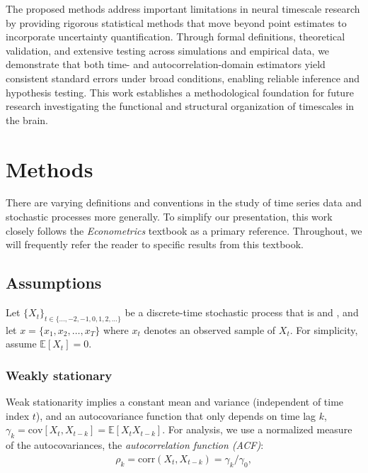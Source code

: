 \documentclass[9pt]{article}
\begin{document}
The proposed methods address important limitations in neural timescale research by providing rigorous statistical methods that move beyond point estimates to incorporate uncertainty quantification. Through formal definitions, theoretical validation, and extensive testing across simulations and empirical data, we demonstrate that both time- and autocorrelation-domain estimators yield consistent standard errors under broad conditions, enabling reliable inference and hypothesis testing. This work establishes a methodological foundation for future research investigating the functional and structural organization of timescales in the brain.

\section{Methods}

There are varying definitions and conventions in the study of time series data and stochastic processes more generally. To simplify our presentation, this work closely follows the \citet{hansen_econometrics_2022} \emph{Econometrics} textbook as a primary reference. Throughout, we will frequently refer the reader to specific results from this textbook.

\subsection{Assumptions} \label{sec:assumptions}

Let $\{X_t\}_{t\in\{\dots, -2, -1, 0, 1, 2, \dots\}}$ be a discrete-time stochastic process that is  and , and let $x = \{x_1, x_2, \ldots, x_T\}$ where $x_t$ denotes an observed sample of $X_t$. For simplicity, assume $\mathbb{E}[X_t] = 0$. 

\subsubsection{Weakly stationary} \label{sec:weak-stationarity}
Weak stationarity implies a constant mean and variance (independent of time index $t$), and an autocovariance function that only depends on time lag $k$, $\gamma_k = \text{cov}[X_t, X_{t-k}] =\mathbb{E}[X_t X_{t-k}]$. For analysis, we use a normalized measure of the autocovariances, the \textit{autocorrelation function (ACF)}:
\begin{align} \label{eq:acf}
\rho_k = \text{corr}(X_t, X_{t-k}) = \gamma_k/\gamma_0,
\end{align}
\end{document}
